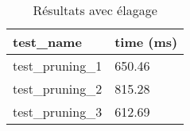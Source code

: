 \begin{table}[!ht]
    \centering
    \begin{tabular}{@{}ll@{}}
        \toprule
        test\_name & time (ms) \\ \midrule
        test\_pruning\_1 & 650.46    \\
        test\_pruning\_2 & 815.28    \\
        test\_pruning\_3 & 612.69 \\ \bottomrule
    \end{tabular}
    \caption{Résultats avec élagage}
\end{table}
